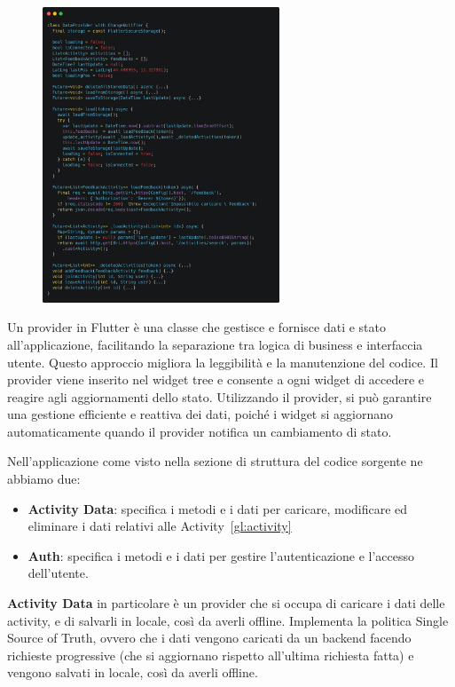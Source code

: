 \documentclass[a4paper,12pt]{article}
\begin{document}
\begin{figure}
    \includegraphics[width=0.63\textwidth]{img/data_provider.png}
\end{figure}
Un provider in Flutter è una classe che gestisce e fornisce dati e stato all'applicazione, facilitando la separazione tra logica di business e interfaccia utente. Questo approccio migliora la leggibilità e la manutenzione del codice. Il provider viene inserito nel widget tree e consente a ogni widget di accedere e reagire agli aggiornamenti dello stato. Utilizzando il provider, si può garantire una gestione efficiente e reattiva dei dati, poiché i widget si aggiornano automaticamente quando il provider notifica un cambiamento di stato. 

Nell'applicazione come visto nella sezione di struttura del codice sorgente ne abbiamo due:

\begin{itemize}
    \item \textbf{Activity Data}: specifica i metodi e i dati per caricare, modificare ed eliminare i dati relativi alle Activity~\ref{gl:activity}
    \item \textbf{Auth}: specifica i metodi e i dati per gestire l'autenticazione e l'accesso dell'utente.
\end{itemize}

\textbf{Activity Data} in particolare è un provider che si occupa di caricare i dati delle activity, e di salvarli in locale, così da averli offline.
Implementa la politica Single Source of Truth, ovvero che i dati vengono caricati da un backend facendo richieste progressive (che si aggiornano rispetto all'ultima richiesta fatta) e vengono salvati in locale, così da averli offline.
\end{document}
